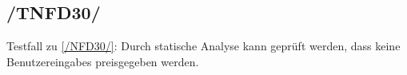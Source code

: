 \subsection*{/TNFD30/}
\label{/TNFD30/} Testfall zu \ref{/NFD30/}: Durch \gls{statische Analyse} kann geprüft werden, dass keine \Glspl{Benutzereingabe} preisgegeben werden.